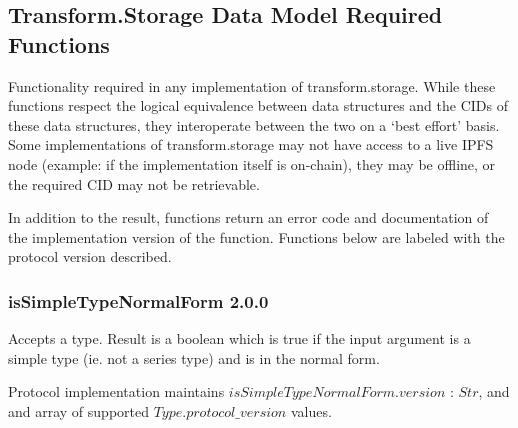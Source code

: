 \documentclass[9pt, oneside]{article}   	%
\begin{document}
\subsection{Transform.Storage Data Model Required Functions}\label{dataModelFuncs}

Functionality required in any implementation of transform.storage. While these functions respect the logical equivalence between data structures and the CIDs of these data structures, they interoperate between the two on a `best effort' basis. Some implementations of transform.storage may not have access to a live IPFS node (example: if the implementation itself is on-chain), they may be offline, or the required CID may not be retrievable.

In addition to the result, functions return an error code and documentation of the implementation version of the function. Functions below are labeled with the protocol version described.

\subsubsection{isSimpleTypeNormalForm 2.0.0}\label{isSimpleTypeNormalForm_code}

Accepts a type. Result is a boolean which is true if the input argument is a simple type (ie. not a series type) and is in the normal form.

Protocol implementation maintains $isSimpleTypeNormalForm.version$ : $Str$, and  and array of supported $Type.protocol\_version$ values.
\end{document}
